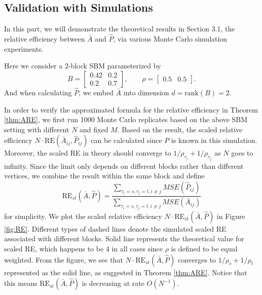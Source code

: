 \documentclass[a4paper]{article}
\begin{document}
\subsection{Validation with Simulations}
In this part, we will demonstrate the theoretical results in Section 3.1, the relative efficiency between $\bar{A}$ and $\hat{P}$, via various Monte Carlo simulation experiments.

Here we consider a 2-block SBM parameterized by
\begin{equation*}
B = \begin{bmatrix}
0.42 & 0.2 \\
0.2 & 0.7
\end{bmatrix}
,\qquad \rho = \begin{bmatrix}
0.5 & 0.5
\end{bmatrix}.
\end{equation*}
And when calculating $\hat{P}$, we embed $\bar{A}$ into dimension $d = \mathrm{rank}(B) = 2$.

In order to verify the approximated formula for the relative efficiency in Theorem \ref{thm:ARE}, we first run 1000 Monte Carlo replicates based on the above SBM setting with different $N$ and fixed $M$. Based on the result, the scaled relative efficiency $N \cdot \mathrm{RE}(\bar{A}_{ij}, \hat{P}_{ij})$ can be calculated since $P$ is known in this simulation. Moreover, the scaled RE in theory should converge to $1/\rho_{\tau_i}+1/\rho_{\tau_j}$ as $N$ goes to infinity. Since the limit only depends on different blocks rather than different vertices, we combine the result within the same block and define
\[
	\mathrm{RE}_{st}(\bar{A},\hat{P}) = \frac{\sum_{\tau_i=s,\tau_j=t,i \ne j} MSE(\hat{P}_{ij})}{\sum_{\tau_i=s,\tau_j=t,i \ne j} MSE(\bar{A}_{ij})}
\]
for simplicity.
We plot the scaled relative efficiency $N \cdot \mathrm{RE}_{st}(\bar{A},\hat{P})$ in Figure \ref{fig:RE}. Different types of dashed lines denote the simulated scaled RE associated with different blocks. Solid line represents the theoretical value for scaled RE, which happens to be 4 in all cases since $\rho$ is defined to be equal weighted. From the figure, we see that $N \cdot \mathrm{RE}_{st}(\bar{A}, \hat{P})$ converges to $1/\rho_s + 1/\rho_t$ represented as the solid line, as suggested in Theorem \ref{thm:ARE}. Notice that this means $\mathrm{RE}_{st}(\bar{A}, \hat{P})$ is decreasing at rate $O(N^{-1})$.
\end{document}
